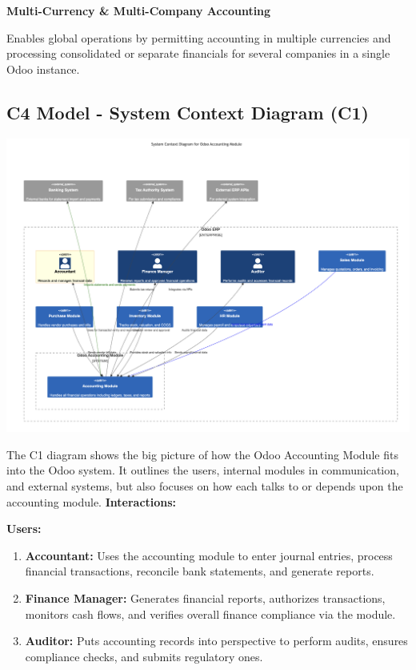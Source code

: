 \documentclass[11pt,a4paper]{article}
\begin{document}
\noindent\textbf{Multi-Currency \& Multi-Company Accounting}

\noindent Enables global operations by permitting accounting in multiple currencies and processing consolidated or separate financials for several companies in a single Odoo instance.

\subsection{C4 Model - System Context Diagram (C1)}
\begin{center}
    \includegraphics[width=0.8\linewidth]{diagram/C1.png}
\end{center}

\noindent The C1 diagram shows the big picture of how the Odoo Accounting Module fits into the Odoo system. It outlines the users, internal modules in communication, and external systems, but also focuses on how each talks to or depends upon the accounting module.
\bigskip
\noindent\textbf{Interactions:}

\noindent\textbf{Users:}
\begin{enumerate}[label=\roman*.]
    \item \textbf{Accountant:} Uses the accounting module to enter journal entries, process financial transactions, reconcile bank statements, and generate reports.
    \item \textbf{Finance Manager:} Generates financial reports, authorizes transactions, monitors cash flows, and verifies overall finance compliance via the module.
    \item \textbf{Auditor:} Puts accounting records into perspective to perform audits, ensures compliance checks, and submits regulatory ones.
\end{enumerate}
\end{document}

